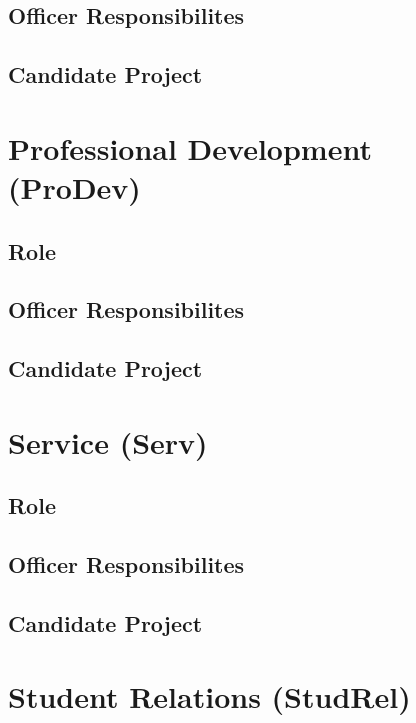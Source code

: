 \documentclass[11pt, article, oneside]{memoir}
\begin{document}
    \subsection{Officer Responsibilites}

    \subsection{Candidate Project}

    \bigbreak

    
    \section{Professional Development (ProDev)}
    \subsection{Role}

    \subsection{Officer Responsibilites}

    \subsection{Candidate Project}


    \bigbreak

    
    \section{Service (Serv)}
    \subsection{Role}

    \subsection{Officer Responsibilites}

    \subsection{Candidate Project}


    \bigbreak

    
    \section{Student Relations (StudRel)}
\end{document}
